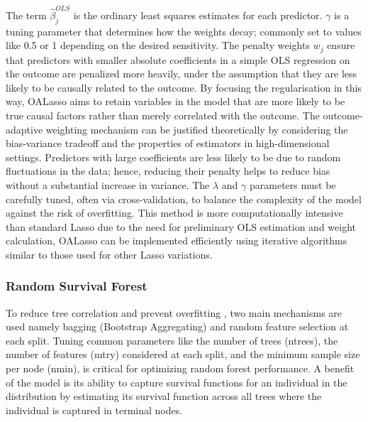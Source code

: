 \noindent The term \(\hat{\beta}_{j}^{OLS}\) is the ordinary least squares estimates for each predictor. \(\gamma\) is a tuning parameter that determines how the weights decay; commonly set to values like 0.5 or 1 depending on the desired sensitivity. The penalty weights \(w_{j}\) ensure that predictors with smaller absolute coefficients in a simple OLS regression on the outcome are penalized more heavily, under the assumption that they are less likely to be causally related to the outcome. By focusing the regularisation in this way, \parencite{shortreed_outcome-adaptive_2017} OALasso aims to retain variables in the model that are more likely to be true causal factors rather than merely correlated with the outcome. The outcome-adaptive weighting mechanism can be justified theoretically by considering the bias-variance tradeoff and the properties of estimators in high-dimensional settings. Predictors with large coefficients are less likely to be due to random fluctuations in the data; hence, reducing their penalty helps to reduce bias without a substantial increase in variance. The \(\lambda\) and \(\gamma\) parameters must be carefully tuned, often via cross-validation, to balance the complexity of the model against the risk of overfitting. This method is more computationally intensive than standard Lasso due to the need for preliminary OLS estimation and weight calculation, OALasso can be implemented efficiently using iterative algorithms \parencite{shortreed_outcome-adaptive_2017} similar to those used for other Lasso variations.

\subsubsection{Random Survival Forest}
\noindent To reduce tree correlation and prevent overfitting \parencite{pham_springer_2023}, two main mechanisms are used namely bagging (Bootstrap Aggregating) and random feature selection at each split. Tuning common parameters like the number of trees (ntrees), the number of features (mtry) considered at each split, and the minimum sample size per node (nmin), is critical for optimizing random forest performance. A benefit of the model is its ability to capture survival functions for an individual in the distribution by estimating its survival function across all trees where the individual is captured in terminal nodes. 

